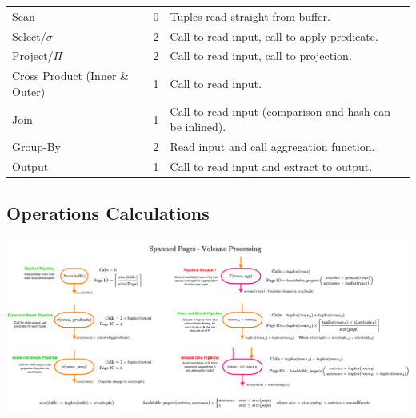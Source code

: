 \begin{center}
  \begin{tabular}{l l p{}}
    Scan                           & 0 & Tuples read straight from buffer.                        \\
    Select/$\sigma$                & 2 & Call to read input, call to apply predicate.             \\
    Project/$\Pi$                  & 2 & Call to read input, call to projection.                  \\
    Cross Product (Inner \& Outer) & 1 & Call to read input.                                      \\
    Join                           & 1 & Call to read input (comparison and hash can be inlined). \\
    Group-By                       & 2 & Read input and call aggregation function.                \\
    Output                         & 1 & Call to read input and extract to output.                \\
  \end{tabular}
\end{center}

\subsection{Operations Calculations}
\begin{center}
  \includegraphics[width=\textwidth]{processing_models/images/spanned_pages_volcano_processing_calcs.drawio.png}
\end{center}

